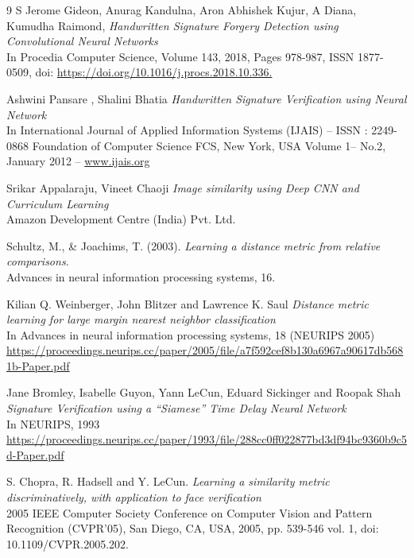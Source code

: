 \begin{thebibliography}{9}
S Jerome Gideon, Anurag Kandulna, Aron Abhishek Kujur, A Diana, Kumudha Raimond,
\textit{ Handwritten Signature Forgery Detection using Convolutional Neural Networks } \\
In Procedia Computer Science, Volume 143, 2018, Pages 978-987, ISSN 1877-0509, doi: \url{https://doi.org/10.1016/j.procs.2018.10.336.}

Ashwini Pansare , Shalini Bhatia
\textit{ Handwritten Signature Verification using Neural Network } \\
In International Journal of Applied Information Systems (IJAIS) – ISSN : 2249-0868
Foundation of Computer Science FCS, New York, USA
Volume 1– No.2, January 2012 – \url{www.ijais.org}

Srikar Appalaraju, Vineet Chaoji
\textit{ Image similarity using Deep CNN and Curriculum Learning } \\
Amazon Development Centre (India) Pvt. Ltd.






Schultz, M., \& Joachims, T. (2003).
\textit{ Learning a distance metric from relative comparisons. } \\
Advances in neural information processing systems, 16.

Kilian Q. Weinberger, John Blitzer and Lawrence K. Saul
\textit{ Distance metric learning for large margin nearest neighbor classification } \\
In Advances in neural information processing systems, 18 (NEURIPS 2005)
\url{https://proceedings.neurips.cc/paper/2005/file/a7f592cef8b130a6967a90617db5681b-Paper.pdf}

Jane Bromley, Isabelle Guyon, Yann LeCun, Eduard Sickinger and Roopak Shah 
\textit{ Signature Verification using a ``Siamese'' Time Delay Neural Network  } \\
In NEURIPS, 1993 \url{https://proceedings.neurips.cc/paper/1993/file/288cc0ff022877bd3df94bc9360b9c5d-Paper.pdf }

S. Chopra, R. Hadsell and Y. LeCun.
\textit{ Learning a similarity metric discriminatively, with application to face verification } \\
2005 IEEE Computer Society Conference on Computer Vision and Pattern Recognition (CVPR'05), San Diego, CA, USA, 2005, pp. 539-546 vol. 1, doi: 10.1109/CVPR.2005.202.


\end{thebibliography}
